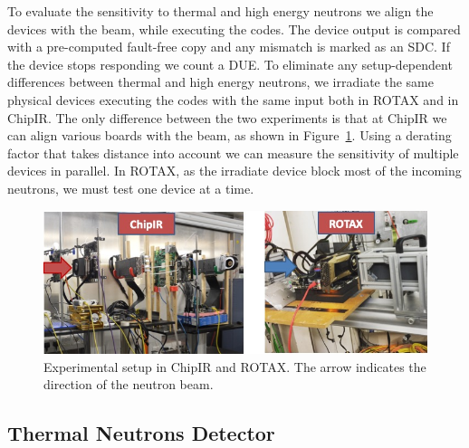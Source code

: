 To evaluate the sensitivity to thermal and high energy neutrons we align the devices with the beam, while executing the codes. The device output is compared with a pre-computed fault-free copy and any mismatch is marked as an SDC. If the device stops responding we count a DUE.  To eliminate any setup-dependent differences between thermal and high energy neutrons, we irradiate the same physical devices executing the codes with the same input both in ROTAX and in ChipIR. The only difference between the two experiments is that at ChipIR we can align various boards with the beam, as shown in Figure~\ref{rad_setup}. Using a derating factor that takes distance into account we can measure the sensitivity of multiple devices in parallel. In ROTAX, as the irradiate device block most of the incoming neutrons, we must test one device at a time.


%
%
\begin{figure}[tb]
\centering
\includegraphics[width=0.80\columnwidth]{./figs/setup}
\caption{Experimental setup in ChipIR and ROTAX. The arrow indicates the direction of the neutron beam.}
\label{rad_setup}
\end{figure}


\subsection{Thermal Neutrons Detector}
\label{sub_detector}


